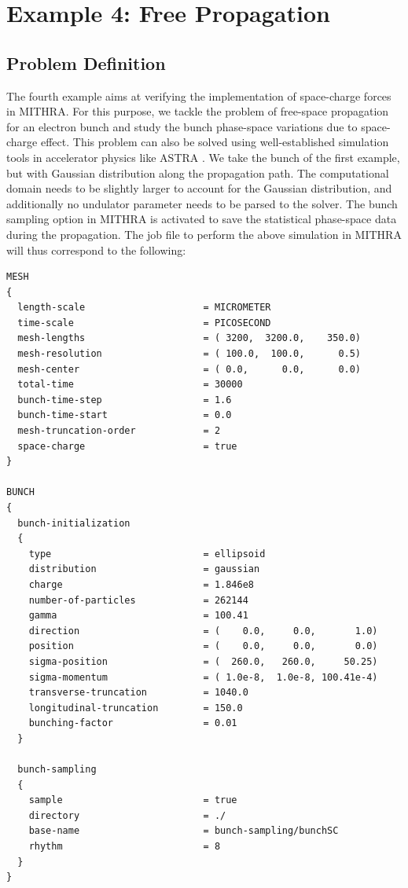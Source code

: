 \section{Example 4: Free Propagation}

\subsection{Problem Definition}

The fourth example aims at verifying the implementation of space-charge forces in MITHRA.
%
For this purpose, we tackle the problem of free-space propagation for an electron bunch and study the bunch phase-space variations due to space-charge effect.
%
This problem can also be solved using well-established simulation tools in accelerator physics like ASTRA \cite{flottmann2011astra}.
%
We take the bunch of the first example, but with Gaussian distribution along the propagation path.
%
The computational domain needs to be slightly larger to account for the Gaussian distribution, and additionally no undulator parameter needs to be parsed to the solver.
%
The bunch sampling option in MITHRA is activated to save the statistical phase-space data during the propagation.
%
The job file to perform the above simulation in MITHRA will thus correspond to the following:
%
\begin{snugshade}
\begin{Verbatim}[fontsize=\small, tabsize = 4]
MESH
{
  length-scale                     = MICROMETER
  time-scale                       = PICOSECOND
  mesh-lengths                     = ( 3200,  3200.0,    350.0)
  mesh-resolution                  = ( 100.0,  100.0,      0.5)
  mesh-center                      = ( 0.0,      0.0,      0.0)
  total-time                       = 30000
  bunch-time-step                  = 1.6
  bunch-time-start                 = 0.0
  mesh-truncation-order            = 2
  space-charge                     = true
}

BUNCH
{
  bunch-initialization
  {
    type                           = ellipsoid
    distribution                   = gaussian
    charge                         = 1.846e8
    number-of-particles            = 262144
    gamma                          = 100.41
    direction                      = (    0.0,     0.0,       1.0)
    position                       = (    0.0,     0.0,       0.0)
    sigma-position                 = (  260.0,   260.0,     50.25)
    sigma-momentum                 = ( 1.0e-8,  1.0e-8, 100.41e-4)
    transverse-truncation          = 1040.0
    longitudinal-truncation        = 150.0
    bunching-factor                = 0.01
  }

  bunch-sampling
  {
    sample                         = true
    directory                      = ./
    base-name                      = bunch-sampling/bunchSC
    rhythm                         = 8
  }
}
\end{Verbatim}
\end{snugshade}

